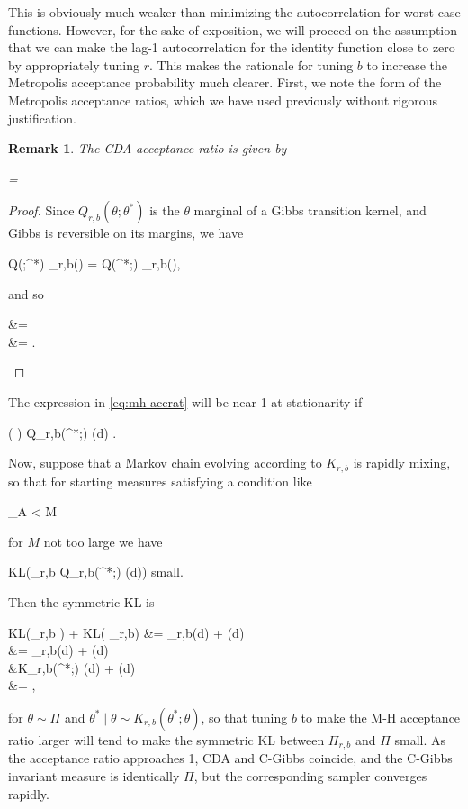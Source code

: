 \documentclass[10pt]{article}
\newtheorem{remark}{Remark}
\newcommand{\be}{\begin{equs}}
\newcommand{\ee}{\end{equs}}
\newcommand{\bb}[1]{\mathbb{#1}}
\newcommand{\KL}[2]{\textnormal{KL}\left(#1 \parallel #2\right)}
\begin{document}
This is obviously much weaker than minimizing the autocorrelation for worst-case functions. However, for the sake of exposition, we will proceed on the assumption that we can make the lag-1 autocorrelation for the identity function close to zero by appropriately tuning $r$. This makes the rationale for tuning $b$ to increase the Metropolis acceptance probability much clearer. First, we note the form of the Metropolis acceptance ratios, which we have used previously without rigorous justification.
\begin{remark}
The CDA acceptance ratio is given by
\be
{} =  \label{eq:mh-accrat}
\ee
\end{remark}
\begin{proof}
Since $Q_{r,b}(\theta;\theta^*)$ is the $\theta$ marginal of a Gibbs transition kernel, and Gibbs is reversible on its margins, we have
\be
Q(\theta;\theta^*) \Pi_{r,b}(\theta) = Q(\theta^*;\theta) \Pi_{r,b}(\theta),
\ee 
and so
\be
{} &=  \\
&= .
\ee
\end{proof}

The expression in \eqref{eq:mh-accrat} will be near 1 at stationarity if 
\be 
\int \log \left(  \right) Q_{r,b}(\theta^*;\theta) \Pi(d\theta) .
\ee
Now, suppose that a Markov chain evolving according to $K_{r,b}$ is rapidly mixing, so that for starting measures satisfying a condition like
\be
\sup_A  < M
\ee 
for $M$ not too large we have 
\be
\KL{\Pi_{r,b}}{\int Q_{r,b}(\theta^*;\theta) \nu(d\theta)} \quad \textnormal{small}.
\ee
Then the symmetric KL is 
\be
\KL{\Pi_{r,b}}{\Pi} + \KL{\Pi}{\Pi_{r,b}} &= \int \Pi_{r,b}(d\theta) \log {} + \int \Pi(d\theta) \log {} \\
&= \int \Pi_{r,b}(d\theta) \log {} + \int \Pi(d\theta) \log {} \\
&\approx \int K_{r,b}(\theta^*;\theta) \Pi(d\theta) \log {} + \int \Pi(d\theta) \log {} \\
&= \bb E ,
\ee
for $\theta \sim \Pi$ and $\theta^* \mid \theta \sim K_{r,b}(\theta^*;\theta)$, so that tuning $b$ to make the M-H acceptance ratio larger will tend to make the symmetric KL between $\Pi_{r,b}$ and $\Pi$ small. As the acceptance ratio approaches 1, CDA and C-Gibbs coincide, and the C-Gibbs invariant measure is identically $\Pi$, but the corresponding sampler converges rapidly.
\end{document}
